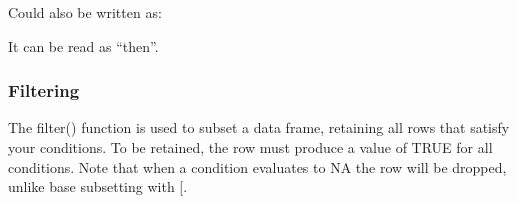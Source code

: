 \documentclass[
]{book}
\newenvironment{Shaded}{\begin{snugshade}}{\end{snugshade}}
\newcommand{\DataTypeTok}[1]{\textcolor[rgb]{0.13,0.29,0.53}{#1}}
\newcommand{\DecValTok}[1]{\textcolor[rgb]{0.00,0.00,0.81}{#1}}
\newcommand{\FloatTok}[1]{\textcolor[rgb]{0.00,0.00,0.81}{#1}}
\newcommand{\KeywordTok}[1]{\textcolor[rgb]{0.13,0.29,0.53}{\textbf{#1}}}
\newcommand{\NormalTok}[1]{#1}
\newcommand{\OperatorTok}[1]{\textcolor[rgb]{0.81,0.36,0.00}{\textbf{#1}}}
\newcommand{\StringTok}[1]{\textcolor[rgb]{0.31,0.60,0.02}{#1}}
\begin{document}
Could also be written as:

\begin{Shaded}
\end{Shaded}

It can be read as ``then''.

\hypertarget{filtering}{%
\subsubsection*{Filtering}\label{filtering}}

The filter() function is used to subset a data frame, retaining all rows that satisfy your conditions. To be retained, the row must produce a value of TRUE for all conditions. Note that when a condition evaluates to NA the row will be dropped, unlike base subsetting with {[}.

\begin{Shaded}
\end{Shaded}
\end{document}
